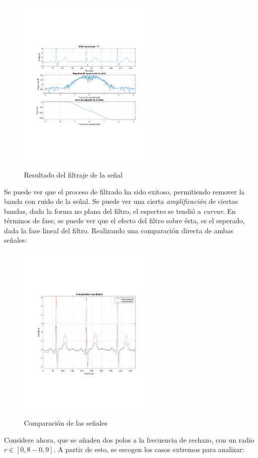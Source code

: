 		\begin{figure}[H]
			\center
			\includegraphics[width=0.6\textwidth,clip, trim = {1.9cm 6.8cm 2.3cm 7cm}]{../plots/ecg_poles_0_filtered.pdf}
			\caption{Resultado del filtraje de la señal}
			\label{fig:ecg_filtered_0}
		\end{figure}
		
		Se puede ver que el proceso de filtrado ha sido exitoso, permitiendo remover la banda con ruido de la señal. Se puede ver una cierta \textit{amplificación} de ciertas bandas, dada la forma no plana del filtro, el espectro se tendió a \textit{curvar}. En términos de fase, se puede ver que el efecto del filtro sobre ésta, es el esperado, dada la fase lineal del filtro. Realizando una comparación directa de ambas señales:
		\begin{figure}[H]
			\center
			\includegraphics[width=0.6\textwidth,clip, trim = {1.9cm 6.8cm 2.3cm 7cm}]{../plots/egc_f_0_comparative.pdf}
			\caption{Comparación de las señales}
			\label{fig:ecg_filtered_0_comparative}
		\end{figure}
		
		
		
		
		Considere ahora, que se añaden dos polos a la frecuencia de rechazo, con un radio $r \in [0,8  - 0,9]$. A partir de esto, se escogen los casos extremos para analizar:
		 
	
	